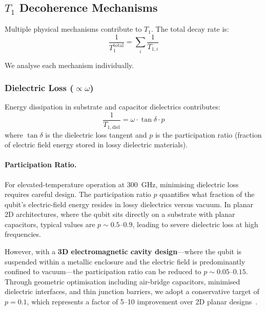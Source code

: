 \subsection{$T_1$ Decoherence Mechanisms}

Multiple physical mechanisms contribute to $T_1$. The total decay rate is:
\begin{equation}
\frac{1}{T_1^{\text{total}}} = \sum_i \frac{1}{T_{1,i}}
\label{eq:t1_total}
\end{equation}

We analyse each mechanism individually.

\subsubsection{Dielectric Loss ($\propto \omega$)}
\label{sec:dielectric_loss_300ghz}

Energy dissipation in substrate and capacitor dielectrics contributes:
\begin{equation}
\frac{1}{T_{1,\text{diel}}} = \omega \cdot \tan\delta \cdot p
\label{eq:t1_dielectric}
\end{equation}
where $\tan\delta$ is the dielectric loss tangent and $p$ is the participation ratio (fraction of electric field energy stored in lossy dielectric materials).

\paragraph{Participation Ratio.} 
For elevated-temperature operation at 300~GHz, minimising dielectric loss requires careful design. The participation ratio $p$ quantifies what fraction of the qubit's electric-field energy resides in lossy dielectrics versus vacuum. In planar 2D architectures, where the qubit sits directly on a substrate with planar capacitors, typical values are $p \sim 0.5$--$0.9$, leading to severe dielectric loss at high frequencies. 

However, with a \textbf{3D electromagnetic cavity design}—where the qubit is suspended within a metallic enclosure and the electric field is predominantly confined to vacuum—the participation ratio can be reduced to $p \sim 0.05$--$0.15$. Through geometric optimisation including air-bridge capacitors, minimised dielectric interfaces, and thin junction barriers, we adopt a conservative target of \textbf{$p = 0.1$}, which represents a factor of 5--10 improvement over 2D planar designs~\cite{place2021,Wang2015}.


